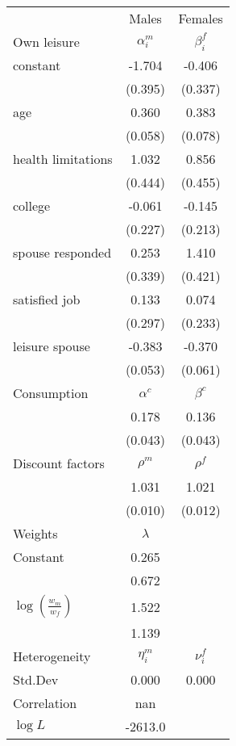 \begin{tabular}{lcc} 
\hline\hline 
 & Males & Females \\ 
Own leisure & $\alpha_{i}^{m}$ & $\beta_{i}^{f}$ \\ 
constant & -1.704 & -0.406 \\ 
 & (0.395) & (0.337) \\ 
age & 0.360 & 0.383 \\ 
 & (0.058) & (0.078) \\ 
health limitations & 1.032 & 0.856 \\ 
 & (0.444) & (0.455) \\ 
college & -0.061 & -0.145 \\ 
 & (0.227) & (0.213) \\ 
spouse responded & 0.253 & 1.410 \\ 
 & (0.339) & (0.421) \\ 
satisfied job & 0.133 & 0.074 \\ 
 & (0.297) & (0.233) \\ 
leisure spouse & -0.383 & -0.370 \\ 
 & (0.053) & (0.061) \\ 
Consumption & $\alpha^{c}$ & $\beta^{c}$ \\ 
 & 0.178 & 0.136 \\ 
 & (0.043) & (0.043) \\ 
Discount factors & $\rho^m$ & $\rho^f$ \\ 
 & 1.031 & 1.021 \\ 
 & (0.010) & (0.012) \\ 
Weights & $\lambda$ &  \\ 
Constant & 0.265 &  \\ 
 & 0.672 &  \\ 
$\log(\frac{w_m}{w_f})$ & 1.522 &  \\ 
 & 1.139 &  \\ 
Heterogeneity & $\eta_i^m$ & $\nu_i^f$ \\ 
Std.Dev & 0.000 & 0.000 \\ 
Correlation & nan &  \\ 
\hline 
$\log L$ & -2613.0 & \\ 
\hline \hline 
\end{tabular} 
